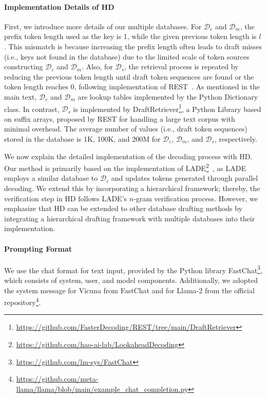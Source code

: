 \paragraph{Implementation Details of HD}  First, we introduce more details of our multiple databases. For \(\mathcal{D}_c\) and \(\mathcal{D}_m\), the prefix token length used as the key is 1, while the given previous token length is \(l\). This mismatch is because increasing the prefix length often leads to draft misses (i.e., keys not found in the database) due to the limited scale of token sources constructing \(\mathcal{D}_c\) and \(\mathcal{D}_m\). Also, for \(\mathcal{D}_s\), the retrieval process is repeated by reducing the previous token length until draft token sequences are found or the token length reaches 0, following implementation of REST~\cite{REST}.
As mentioned in the main text, \(\mathcal{D}_c\) and \(\mathcal{D}_m\) are lookup tables implemented by the Python Dictionary class. In contrast, \(\mathcal{D}_s\) is implemented by DraftRetriever\footnote{\scriptsize{\url{https://github.com/FasterDecoding/REST/tree/main/DraftRetriever}}}, a Python Library based on suffix arrays, proposed by REST for handling a large text corpus with minimal overhead.
The average number of values (i.e., draft token sequences) stored in the database is 1K, 100K, and 200M for \(\mathcal{D}_c\), \(\mathcal{D}_m\), and \(\mathcal{D}_s\), respectively.

We now explain the detailed implementation of the decoding process with HD. Our method is primarily based on the implementation of LADE\footnote{\scriptsize \url{https://github.com/hao-ai-lab/LookaheadDecoding}}~\cite{LAD}, as LADE employs a similar database to $\mathcal{D}_c$ and updates tokens generated through parallel decoding. We extend this by incorporating a hierarchical framework; thereby, the verification step in HD follows LADE’s $n$-gram verification process. However, we emphasize that HD can be extended to other database drafting methods by integrating a hierarchical drafting framework with multiple databases into their implementation.

\paragraph{Prompting Format}
We use the chat format for text input, provided by the Python library FastChat\footnote{\scriptsize \url{https://github.com/lm-sys/FastChat}}, which consists of system, user, and model components. Additionally, we adopted the system message for Vicuna from FastChat and for Llama-2 from the official repository\footnote{\scriptsize \url{https://github.com/meta-llama/llama/blob/main/example_chat_completion.py}}.

